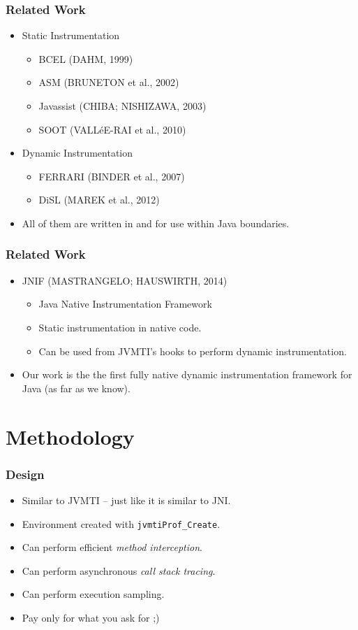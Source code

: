 \documentclass{beamer}
\begin{document}
\begin{frame}
\frametitle{Related Work}
\begin{itemize}
\item Static Instrumentation
\begin{itemize}
\item BCEL (DAHM, 1999)
\item ASM (BRUNETON et al., 2002)
\item Javassist (CHIBA; NISHIZAWA, 2003)
\item SOOT (VALLéE-RAI et al., 2010)
\end{itemize}
\item Dynamic Instrumentation
\begin{itemize}
\item FERRARI (BINDER et al., 2007)
\item DiSL (MAREK et al., 2012)
\end{itemize}
\item All of them are written in and for use within Java boundaries.
\end{itemize}
\end{frame}

\begin{frame}
\frametitle{Related Work}
\begin{itemize}
\item JNIF (MASTRANGELO; HAUSWIRTH, 2014)
\begin{itemize}
\item Java Native Instrumentation Framework
\item Static instrumentation in native code.
\item Can be used from JVMTI's hooks to perform dynamic instrumentation.
\end{itemize}
\item Our work is the the first fully native dynamic instrumentation framework for Java (as far as we know).
\end{itemize}
\end{frame}


\section{Methodology}

\begin{frame}
\frametitle{Design}
\begin{itemize}
\item Similar to JVMTI -- just like it is similar to JNI.
\item Environment created with \lstinline{jvmtiProf_Create}.
\item Can perform efficient \emph{method interception}.
\item Can perform asynchronous \emph{call stack tracing}.
\item Can perform execution sampling.
\item Pay only for what you ask for ;)
\end{itemize}
\end{frame}
\end{document}
